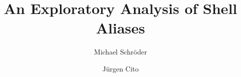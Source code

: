 \documentclass[sigconf,review]{acmart}
\begin{document}
\title{An Exploratory Analysis of Shell Aliases}

\author{Michael Schröder}

\author{Jürgen Cito}

\begin{abstract}
	
\end{abstract}

\maketitle







%










%
\end{document}
